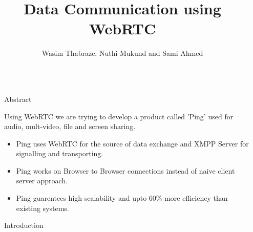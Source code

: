 \documentclass[final]{beamer}
\title{Data Communication using WebRTC} %
\author{Wasim Thabraze, Nuthi Mukund and Sami Ahmed} %
\institute{Department of Computer Science, MVSR Engineering College} %
\newlength{\sepwid}
\newlength{\onecolwid}
\begin{document}

\setlength{\belowcaptionskip}{2ex} %
\setlength\belowdisplayshortskip{2ex} %

\begin{frame}[t] %

\begin{columns}[t] %

\begin{column}{\sepwid}\end{column} %

\begin{column}{\onecolwid} %


\begin{alertblock}{Abstract}

Using WebRTC we are trying to develop a product called 'Ping' used for audio, mult-video, file and screen sharing.
\begin{itemize}
\item Ping uses WebRTC for the source of data exchange and XMPP Server for signalling and transporting.
\item Ping works on Browser to Browser connections instead of naive client server approach.
\item Ping guarentees high scalability and upto 60\% more efficiency than existing systems.
\end{itemize}

\end{alertblock}


\begin{block}{Introduction}


\end{block}
\end{column}
\end{columns}
\end{frame}
\end{document}
